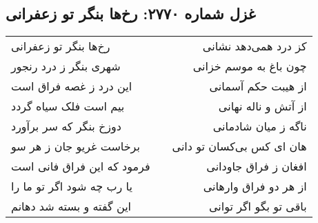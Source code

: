 \begin{center}
\section*{غزل شماره ۲۷۷۰: رخ‌ها بنگر تو زعفرانی}
\label{sec:2770}
\begin{longtable}{l p{0.5cm} r}
رخ‌ها بنگر تو زعفرانی
&&
کز درد همی‌دهد نشانی
\\
شهری بنگر ز درد رنجور
&&
چون باغ به موسم خزانی
\\
این درد ز غصه فراق است
&&
از هیبت حکم آسمانی
\\
بیم است فلک سیاه گردد
&&
از آتش و ناله نهانی
\\
دوزخ بنگر که سر برآورد
&&
ناگه ز میان شادمانی
\\
برخاست غریو جان ز هر سو
&&
هان ای کس بی‌کسان تو دانی
\\
فرمود که این فراق فانی است
&&
افغان ز فراق جاودانی
\\
یا رب چه شود اگر تو ما را
&&
از هر دو فراق وارهانی
\\
این گفته و بسته شد دهانم
&&
باقی تو بگو اگر توانی
\\
\end{longtable}
\end{center}
